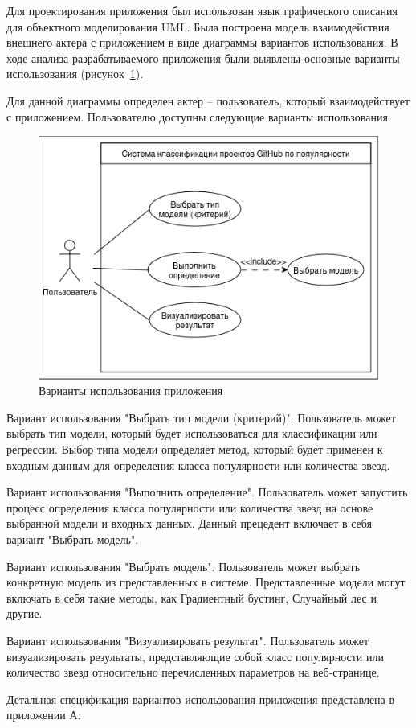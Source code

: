 Для проектирования приложения был использован язык графического описания для объектного моделирования UML. Была построена модель взаимодействия внешнего актера с приложением в виде диаграммы вариантов использования. В ходе анализа разрабатываемого приложения были выявлены основные варианты использования (рисунок~\ref{ris:variants}).

Для данной диаграммы определен актер -- пользователь, который взаимодействует с приложением. Пользователю доступны следующие варианты использования.

\begin{figure}[h]
    \centering
    \includegraphics[width=1\linewidth]{pic/variants.png}
    \vspace{-1em}\caption{Варианты использования приложения}
    \label{ris:variants}
\end{figure}
\vspace{1em}
\begin{enumerateparen}
    \item Вариант использования "Выбрать тип модели (критерий)". Пользователь может выбрать тип модели, который будет использоваться для классификации или регрессии. Выбор типа модели определяет метод, который будет применен к входным данным для определения класса популярности или количества звезд.
    
    \item Вариант использования "Выполнить определение". Пользователь может запустить процесс определения класса популярности или количества звезд на основе выбранной модели и входных данных. Данный прецедент включает в себя вариант "Выбрать модель".

    \item Вариант использования "Выбрать модель". Пользователь может выбрать конкретную модель из представленных в системе. Представленные модели могут включать в себя такие методы, как Градиентный бустинг, Случайный лес и другие. 

    \item Вариант использования "Визуализировать результат". Пользователь может визуализировать результаты, представляющие собой класс популярности или количество звезд относительно перечисленных параметров на веб-странице. 
\end{enumerateparen}
Детальная спецификация вариантов использования приложения представлена в приложении А.


